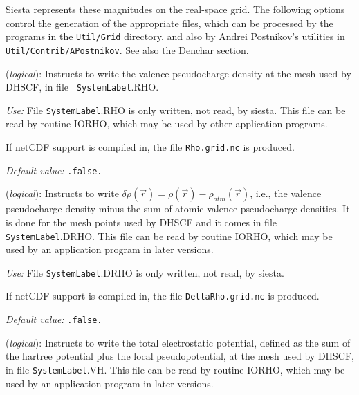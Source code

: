 \documentclass[11pt]{article}
\begin{document}
{\sc Siesta} represents these magnitudes on the real-space grid. The
following options control the generation of the appropriate files,
which can be processed by the programs in the {\tt Util/Grid}
directory, and also by Andrei Postnikov's utilities in {\tt
  Util/Contrib/APostnikov}. See also the Denchar section.

\begin{description}
\itemsep 10pt
\parsep 0pt

\item[{\bf SaveRho}] ({\it logical}):  Instructs to write the
  valence pseudocharge density at the mesh used by DHSCF, in file {\tt
    SystemLabel}.RHO. 

{\it Use:} File {\tt SystemLabel}.RHO is only written, not read, by siesta.
This file can be read by routine IORHO, which may be used by other
application programs.

If netCDF support is compiled in, the file {\tt Rho.grid.nc} is produced.

{\it Default value:} {\tt .false.}
        

\item[{\bf SaveDeltaRho}] ({\it logical}): 
Instructs to write $\delta \rho(\vec r) = \rho(\vec r) - \rho_{atm}(\vec r)$,
i.e., the valence pseudocharge density minus the sum of atomic valence
pseudocharge densities. It is done for the mesh points used by DHSCF and it
comes in file {\tt SystemLabel}.DRHO. This file can be read by routine IORHO,
which may be used by an application program in later versions.

{\it Use:} File {\tt SystemLabel}.DRHO is only written, not read, by siesta.

If netCDF support is compiled in, the file {\tt DeltaRho.grid.nc} is produced.

{\it Default value:} {\tt .false.}
        

\item[{\bf SaveElectrostaticPotential}] ({\it logical}): 
Instructs to write the total electrostatic potential, defined as the
sum of the hartree potential plus the local pseudopotential, at the
mesh used by DHSCF,
in file {\tt SystemLabel}.VH. This file can be read by routine IORHO,
which may be used by an application program in later versions.


\end{description}
\end{document}
